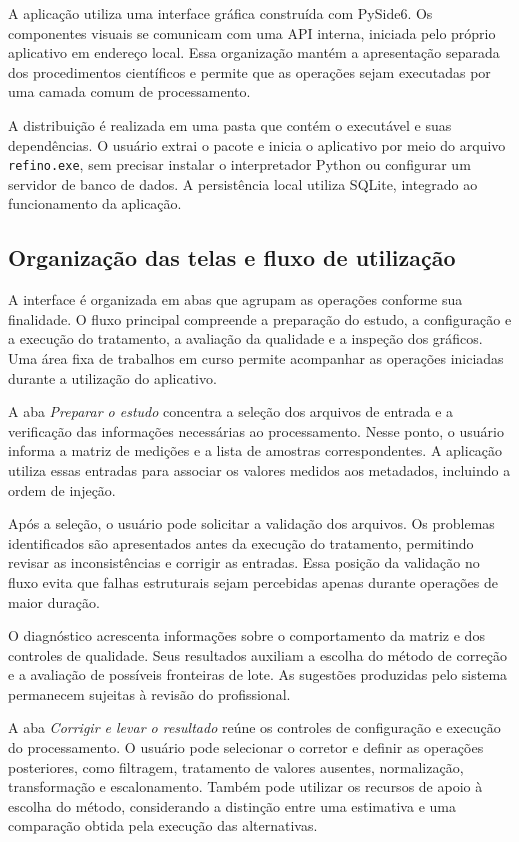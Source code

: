 A aplicação utiliza uma interface gráfica construída com PySide6. Os componentes visuais se comunicam com uma API interna, iniciada pelo próprio aplicativo em endereço local. Essa organização mantém a apresentação separada dos procedimentos científicos e permite que as operações sejam executadas por uma camada comum de processamento.

A distribuição é realizada em uma pasta que contém o executável e suas dependências. O usuário extrai o pacote e inicia o aplicativo por meio do arquivo \texttt{refino.exe}, sem precisar instalar o interpretador Python ou configurar um servidor de banco de dados. A persistência local utiliza SQLite, integrado ao funcionamento da aplicação.

\subsection{Organização das telas e fluxo de utilização}
\label{subsec:organizacao-telas-fluxo}

A interface é organizada em abas que agrupam as operações conforme sua finalidade. O fluxo principal compreende a preparação do estudo, a configuração e a execução do tratamento, a avaliação da qualidade e a inspeção dos gráficos. Uma área fixa de trabalhos em curso permite acompanhar as operações iniciadas durante a utilização do aplicativo.

A aba \textit{Preparar o estudo} concentra a seleção dos arquivos de entrada e a verificação das informações necessárias ao processamento. Nesse ponto, o usuário informa a matriz de medições e a lista de amostras correspondentes. A aplicação utiliza essas entradas para associar os valores medidos aos metadados, incluindo a ordem de injeção.

Após a seleção, o usuário pode solicitar a validação dos arquivos. Os problemas identificados são apresentados antes da execução do tratamento, permitindo revisar as inconsistências e corrigir as entradas. Essa posição da validação no fluxo evita que falhas estruturais sejam percebidas apenas durante operações de maior duração.

O diagnóstico acrescenta informações sobre o comportamento da matriz e dos controles de qualidade. Seus resultados auxiliam a escolha do método de correção e a avaliação de possíveis fronteiras de lote. As sugestões produzidas pelo sistema permanecem sujeitas à revisão do profissional.

A aba \textit{Corrigir e levar o resultado} reúne os controles de configuração e execução do processamento. O usuário pode selecionar o corretor e definir as operações posteriores, como filtragem, tratamento de valores ausentes, normalização, transformação e escalonamento. Também pode utilizar os recursos de apoio à escolha do método, considerando a distinção entre uma estimativa e uma comparação obtida pela execução das alternativas.

